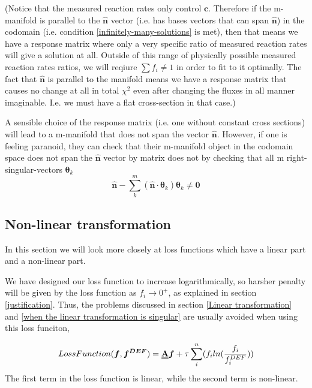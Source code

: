 \documentclass[a4paper, 12pt]{article}
\newcommand{\matr}[1]{\uuline{\bf{#1}}}
\newcommand{\ve}[1]{\boldsymbol{#1}}
\newcommand{\n}[0]{\ve{\hat{n}}}
\begin{document}
\begin{appendices}
(Notice that the measured reaction rates only control $\ve{c}$. Therefore if the m-manifold is parallel to the $\n$ vector (i.e. has bases vectors that can span $\n$) in the codomain (i.e. condition \ref{infinitely-many-solutions} is met), then that means we have a response matrix where only a very specific ratio of measured reaction rates %
will give a solution at all. Outside of this range of physically possible measured reaction rates ratios, we will reqiure $\sum f_i \neq 1$ in order to fit to it optimally.
The fact that $\n$ is parallel to the manifold means we have a response matrix that causes no change at all in total $\chi^2$ even after changing the fluxes in all manner imaginable. I.e. we must have a flat cross-section in that case.)

A sensible choice of the response matrix \matr{R} (i.e. one without constant cross sections) will lead to a m-manifold that does not span the vector $\n$. However, if one is feeling paranoid, they can check that their m-manifold object in the codomain space does not span the $\n$ vector by \matr{A} matrix does not by checking that all m right-singular-vectors $\ve{\theta}_k$
\begin{equation}
\n - \sum_k^m (\n \cdot \ve{\theta}_k)\ve{\theta}_k \neq \ve{0}
\end{equation}

\subsection{Non-linear transformation}
In this section we will look more closely at loss functions which have a linear part and a non-linear part.

We have designed our loss function to increase logarithmically, so harsher penalty will be given by the loss function as $f_i \to 0^{+}$, as explained in section \ref{justification}.
Thus, the problems discussed in section \ref{Linear transformation} and \ref{when the linear transformation is singular} are usually avoided when using this loss funciton,

\begin{equation}
    Loss Function(\ve{f}, \ve{f^{DEF}}) = \matr{A}\ve{f} + \tau \sum_i^n(f_i ln(\frac{f_i}{f^{DEF}_i}))
\end{equation}
The first term in the loss function is linear, while the second term is non-linear.


\end{appendices}
\end{document}
